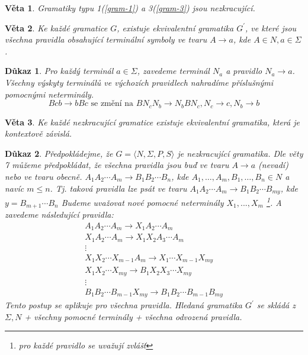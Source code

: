 \documentclass[10pt, a4paper, titlepage]{article}
\theoremstyle{note}
\newtheorem{veta}{\textbf{Věta}}
\newtheorem{dukaz}{\textbf{Důkaz}}
\begin{document}
\begin{veta}
Gramatiky typu 1(\ref{gram-1}) a 3(\ref{gram-3}) jsou nezkracující.
\end{veta}

\begin{veta}
Ke každé gramatice $G$, existuje ekvivalentní gramatika $G^{'}$, ve které jsou všechna pravidla obsahující terminální symboly ve tvaru $A \rightarrow a$, kde $A \in N, a \in \Sigma$.
\end{veta}

\begin{dukaz}
Pro každý terminál $a \in \Sigma$, zavedeme terminál $N_{a}$ a pravidlo $N_{a} \rightarrow a$.
Všechny výskyty terminálů ve výchozích pravidlech nahradíme příslušnými pomocnými neterminály.
$$
Bcb \rightarrow bBc \text{ se změní na } BN_{c}N_{b} \rightarrow N_{b} BN_{c}, 
N_{c} \rightarrow c, N_{b} \rightarrow b
$$
\end{dukaz}

\begin{veta}
Ke každé nezkracující gramatice existuje ekvivalentní gramatika, která je kontextově \emph{závislá}.
\end{veta}

\begin{dukaz}
Předpokládejme, že $G = \langle N, \Sigma, P, S \rangle$ je nezkracující gramatika. Dle věty 7 můžeme předpokládat, 
že všechna pravidla jsou buď ve tvaru $A \rightarrow a$ (nevadí) nebo ve tvaru obecně. 
$A_{1} A_{2} \cdots A_{m} \rightarrow B_{1} B_{2} \cdots B_{n}$, kde $A_{1}, \ldots,A_{m}, B_{1}, \ldots,B_{n} \in N$ a navíc $m \leq n$. 
Tj. taková pravidla lze psát ve tvaru $A_{1} A_{2} \cdots A_{m} \rightarrow B_{1} B_{2} \cdots B_{my}$, kde $y = B_{m+1} \cdots B_{n}$ 
Budeme uvažovat nové pomocné neterminály $X_{1},...,X_{m}$ \footnote{pro každé pravidlo se uvažují zvlášť}. 
A zavedeme následující pravidla:
\begin{gather*}
A_{1} A_{2} \cdots A_{m} \rightarrow X_{1} A_{2} \cdots A_{m} \\
X_{1} A_{2} \cdots A_{m} \rightarrow X_{1} X_{2} A_{3} \cdots A_{m} \\
\vdots \\
X_{1} X_{2} \cdots X_{m-1} A_{m} \rightarrow X_{1} \cdots X_{m-1} X_{my} \\
X_{1} X_{2} \cdots X_{my} \rightarrow B_{1} X_{2} X_{3} \cdots X_{my} \\
\vdots \\
B_{1} B_{2} \cdots B_{m-1} X_{my} \rightarrow B_{1} B_{2} \cdots B_{m-1}B_{my}
\end{gather*}
Tento postup se aplikuje pro všechna pravidla. Hledaná gramatika $G^{'}$ se skládá z $\Sigma, N$ + všechny pomocné terminály + všechna odvozená pravidla.
\end{dukaz}
\end{document}
